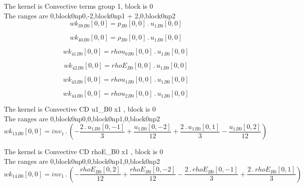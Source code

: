 \documentclass{article}
\begin{document}
\noindent The kernel is Convective terms group 1, block is 0\\\noindent The ranges are 0,block0np0,-2,block0np1 + 2,0,block0np2\\\begin{dmath}{wk_{39}{_{B0}}}[{0,0}] = {p{_{B0}}}[{0,0}] \,.\, {u_{1}{_{B0}}}[{0,0}]\end{dmath}

\begin{dmath}{wk_{40}{_{B0}}}[{0,0}] = {\rho{_{B0}}}[{0,0}] \,.\, {u_{1}{_{B0}}}[{0,0}]\end{dmath}

\begin{dmath}{wk_{41}{_{B0}}}[{0,0}] = {rhou_{0}{_{B0}}}[{0,0}] \,.\, {u_{1}{_{B0}}}[{0,0}]\end{dmath}

\begin{dmath}{wk_{42}{_{B0}}}[{0,0}] = {rhoE{_{B0}}}[{0,0}] \,.\, {u_{1}{_{B0}}}[{0,0}]\end{dmath}

\begin{dmath}{wk_{43}{_{B0}}}[{0,0}] = {rhou_{1}{_{B0}}}[{0,0}] \,.\, {u_{1}{_{B0}}}[{0,0}]\end{dmath}

\begin{dmath}{wk_{44}{_{B0}}}[{0,0}] = {rhou_{2}{_{B0}}}[{0,0}] \,.\, {u_{1}{_{B0}}}[{0,0}]\end{dmath}

\noindent The kernel is Convective CD u1_B0 x1 , block is 0\\\noindent The ranges are 0,block0np0,0,block0np1,0,block0np2\\\begin{dmath}{wk_{13}{_{B0}}}[{0,0}] = inv_1 \,.\, \left(- \frac{2 \,.\, {u_{1}{_{B0}}}[{0,-1}]}{3} + \frac{{u_{1}{_{B0}}}[{0,-2}]}{12} + \frac{2 \,.\, {u_{1}{_{B0}}}[{0,1}]}{3} - \frac{{u_{1}{_{B0}}}[{0,2}]}{12}\right)\end{dmath}

\noindent The kernel is Convective CD rhoE_B0 x1 , block is 0\\\noindent The ranges are 0,block0np0,0,block0np1,0,block0np2\\\begin{dmath}{wk_{14}{_{B0}}}[{0,0}] = inv_1 \,.\, \left(- \frac{{rhoE{_{B0}}}[{0,2}]}{12} + \frac{{rhoE{_{B0}}}[{0,-2}]}{12} - \frac{2 \,.\, {rhoE{_{B0}}}[{0,-1}]}{3} + \frac{2 \,.\, {rhoE{_{B0}}}[{0,1}]}{3}\right)\end{dmath}
\end{document}
